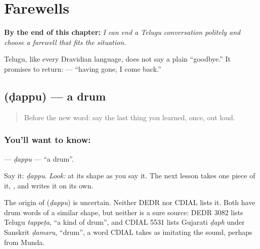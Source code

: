 
\chapter{Farewells}
\label{ch:farewells}

\begin{chapteropening}
\textbf{By the end of this chapter:} \emph{I can end a Telugu conversation politely and choose a farewell that fits the situation.}

Telugu, like every Dravidian language, does not say a plain “goodbye.” It promises to return:   — “having gone, I come back.”
\end{chapteropening}

\section[\texorpdfstring{\te{డప్పు} (ḍappu)}{డప్పు (ḍappu)}]{ (ḍappu) — a drum}

\label{lesson:TE-C04-dappu}



\begin{quote}
Before the new word: say the last thing you learned, once, out loud.
\end{quote}

\subsection*{You'll want to know: }
\textbf{} — \emph{ḍappu} — \textquotedblleft{}a drum\textquotedblright{}.

Say it: \emph{ḍappu}. \emph{Look:} at its shape as you say it. The next lesson takes one piece of it, \textbf{}, and writes it on its own.

\begin{cousinweb}
The origin of \textbf{} (\emph{ḍappu}) is uncertain. Neither DEDR nor CDIAL lists it. Both have drum words of a similar shape, but neither is a sure source: DEDR 3082 lists Telugu \emph{tappeṭa}, \textquotedblleft{}a kind of drum\textquotedblright{}, and CDIAL 5531 lists Gujarati \emph{ḍaph} under Sanskrit \emph{ḍamaru}, \textquotedblleft{}drum\textquotedblright{}, a word CDIAL takes as imitating the sound, perhaps from Munda.
\end{cousinweb}

